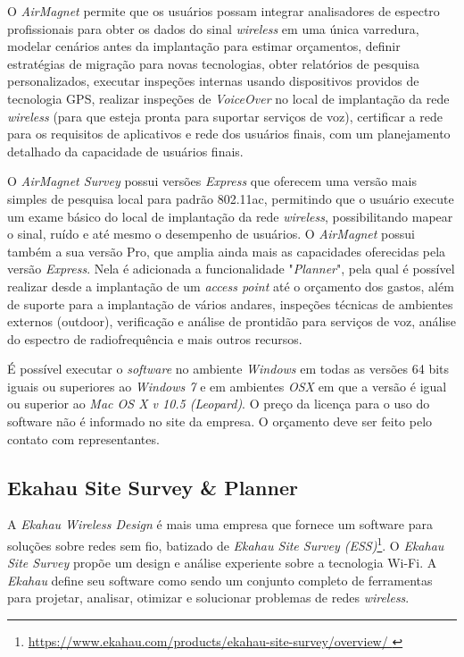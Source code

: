 \documentclass[
	12pt,				%
	openright,			%
	twoside,			%
	a4paper,			%
	english,			%
	french,				%
	spanish,			%
	brazil				%
	]{abntex2}
\begin{document}
O \textit{AirMagnet} permite que os usuários possam integrar analisadores de espectro profissionais para obter os dados do sinal \textit{wireless} em uma única varredura, modelar cenários antes da implantação para estimar orçamentos, definir estratégias de migração para novas tecnologias, obter relatórios de pesquisa personalizados, executar inspeções internas usando dispositivos providos de tecnologia GPS, realizar inspeções de \textit{VoiceOver} no local de implantação da rede \textit{wireless} (para que esteja pronta para suportar serviços de voz), certificar a rede para os requisitos de aplicativos e rede dos usuários finais, com um planejamento detalhado da capacidade de usuários finais.

O \textit{AirMagnet Survey} possui versões \textit{Express} que oferecem uma versão mais simples de pesquisa local para padrão 802.11ac, permitindo que o usuário execute um exame básico do local de implantação da rede \textit{wireless}, possibilitando mapear o sinal, ruído e até mesmo o desempenho de usuários. O \textit{AirMagnet} possui também a sua versão Pro, que amplia ainda mais as capacidades oferecidas pela versão \textit{Express}. Nela é adicionada a funcionalidade "\textit{Planner}", pela qual é possível realizar desde a implantação de um \textit{access point} até o orçamento dos gastos, além de suporte para a implantação de vários andares, inspeções técnicas de ambientes externos (outdoor), verificação e análise de prontidão para serviços de voz, análise do espectro de radiofrequência e mais outros recursos.

É possível executar o \textit{software} no ambiente \textit{Windows} em todas as versões 64 bits iguais ou superiores ao \textit{Windows 7} e em ambientes \textit{OSX} em que a versão é igual ou superior ao \textit{Mac OS X v 10.5 (Leopard)}. O preço da licença para o uso do software não é informado no site da empresa. O orçamento deve ser feito pelo contato com representantes.


\subsection[Ekahau Site Survey \& Planner]{Ekahau Site Survey \& Planner}

A \textit{Ekahau Wireless Design} é mais uma empresa que fornece um software para soluções sobre redes sem fio, batizado de \textit{Ekahau Site Survey (ESS)}\footnote{\url{https://www.ekahau.com/products/ekahau-site-survey/overview/ }}. O \textit{Ekahau Site Survey} propõe um design e análise experiente sobre a tecnologia Wi-Fi. A \textit{Ekahau} define seu software como sendo um conjunto completo de ferramentas para projetar, analisar, otimizar e solucionar problemas de redes \textit{wireless}.
\end{document}
